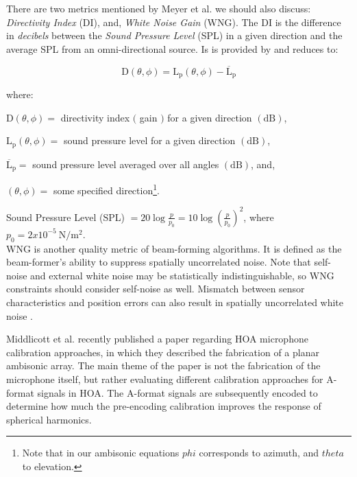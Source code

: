 There are two metrics mentioned by Meyer et al. we should also discuss: \textit{Directivity Index} (DI), and, \textit{White Noise Gain} (WNG). The DI is the difference in \textit{decibels} between the \textit{Sound Pressure Level} (SPL) in a given direction and the average SPL from an omni-directional source. Is is provided by \cite{LONG201439} and reduces to:

$$
\mathrm{D}(\theta, \phi)=\mathrm{L}_{\mathrm{p}}(\theta, \phi)-\overline{\mathrm{L}}_{\mathrm{p}}
$$

\noindent where:
\begin{description}
\item  $\mathrm{D}(\theta, \phi)=$ directivity index $($ gain $)$ for a given direction $(\mathrm{dB})$,
\item  $\mathrm{L}_{\mathrm{p}}(\theta, \phi)=$ sound pressure level for a given direction $(\mathrm{dB})$,
\item $\overline{\mathrm{L}}_{\mathrm{p}}=$ sound pressure level averaged over all angles $(\mathrm{dB})$, and,
\item  $(\theta, \phi)=$ some specified direction\footnote{Note that in our ambisonic equations $phi$ corresponds to azimuth, and $theta$ to elevation.}. \\
\end{description}

Sound Pressure Level (SPL) $=20 \log \frac{p}{p_{0}}=10 \log \left(\frac{p}{p_{0}}\right)^{2}$, where $p_{0}=2 x 10^{-5} \mathrm{~N} / \mathrm{m}^{2}$. \\ 


WNG is another quality metric of beam-forming algorithms. It is defined as the beam-former's ability to suppress spatially uncorrelated noise. Note that self-noise and external white noise may be statistically indistinguishable, so WNG constraints should consider self-noise as well. Mismatch between sensor characteristics and position errors can also result in spatially uncorrelated white noise \cite{mabande2009design}. 



Middlicott et al. \cite{middlicott2019calibration} recently published a paper regarding HOA microphone calibration approaches, in which they described the fabrication of a planar ambisonic array. The main theme of the paper is not the fabrication of the microphone itself, but rather evaluating different calibration approaches for A-format signals in HOA. The A-format signals are subsequently encoded to determine how much the pre-encoding calibration improves the response of spherical harmonics. 

